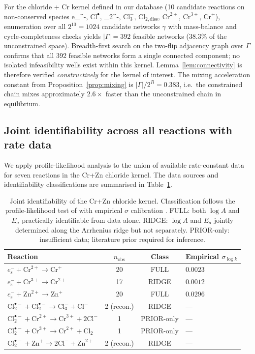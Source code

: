 \documentclass[11pt]{article}
\theoremstyle{definition}
\theoremstyle{remark}
\newcommand{\eS}{e_{\mathrm{s}}^{-}\xspace}
\newcommand{\Clt}{\mathrm{Cl}_2^{\bullet-}\xspace}
\begin{document}
For the chloride + Cr kernel defined in our database (10 candidate reactions on
non-conserved species \eS, $^\bullet$, \Clt, $\mathrm{Cl}_3^-$,
$\mathrm{Cl}_{2,\mathrm{diss}}$, $\mathrm{Cr}^{2+}$, $\mathrm{Cr}^{3+}$, $\mathrm{Cr}^+$),
enumeration over all $2^{10}=1024$ candidate networks $\gamma$ with mass-balance and
cycle-completeness checks yields $|\Gamma|=392$ feasible networks ($38.3\%$ of the
unconstrained space). Breadth-first search on the two-flip adjacency graph over
$\Gamma$ confirms that all 392 feasible networks form a single connected component;
no isolated infeasibility wells exist within this kernel. Lemma~\ref{lem:connectivity}
is therefore verified \emph{constructively} for the kernel of interest. The mixing
acceleration constant from Proposition~\ref{prop:mixing} is
$|\Gamma|/2^R = 0.383$, i.e.\ the constrained chain mixes approximately $2.6\times$
faster than the unconstrained chain in equilibrium.

\subsection{Joint identifiability across all reactions with rate data}\label{sec:joint_id}

We apply profile-likelihood analysis to the union of available rate-constant data for
seven reactions in the Cr+Zn chloride kernel. The data sources and identifiability
classifications are summarised in Table~\ref{tab:identifiability}.

\begin{table}[ht]
\centering
\caption{Joint identifiability of the Cr+Zn chloride kernel. Classification follows
the profile-likelihood test of \citet{Raue2009} with empirical $\sigma$
calibration \citep[\S 2.2.4]{BatesWatts1988}.
FULL: both $\log A$ and $E_a$ practically identifiable from data alone.
RIDGE: $\log A$ and $E_a$ jointly determined along the Arrhenius ridge but not
separately. PRIOR-only: insufficient data; literature prior required for inference.}
\label{tab:identifiability}
\begin{tabular}{l c c l}
\toprule
Reaction & $n_{\mathrm{obs}}$ & Class & Empirical $\sigma_{\log k}$ \\
\midrule
$\eS + \mathrm{Cr}^{2+} \to \mathrm{Cr}^+$ & 20 & FULL & $0.0023$ \\
$\eS + \mathrm{Cr}^{3+} \to \mathrm{Cr}^{2+}$ & 17 & RIDGE & $0.0012$ \\
$\eS + \mathrm{Zn}^{2+} \to \mathrm{Zn}^+$ & 20 & FULL & $0.0296$ \\
$\Clt + \Clt \to \mathrm{Cl}_3^- + \mathrm{Cl}^-$ & 2 (recon.) & RIDGE & --- \\
$\Clt + \mathrm{Cr}^{2+} \to \mathrm{Cr}^{3+} + 2\mathrm{Cl}^-$ & 1 & PRIOR-only & --- \\
$\Clt + \mathrm{Cr}^{3+} \to \mathrm{Cr}^{2+} + \mathrm{Cl}_2$ & 1 & PRIOR-only & --- \\
$\Clt + \mathrm{Zn}^+ \to 2\mathrm{Cl}^- + \mathrm{Zn}^{2+}$ & 2 (recon.) & RIDGE & --- \\
\bottomrule
\end{tabular}
\end{table}
\end{document}
